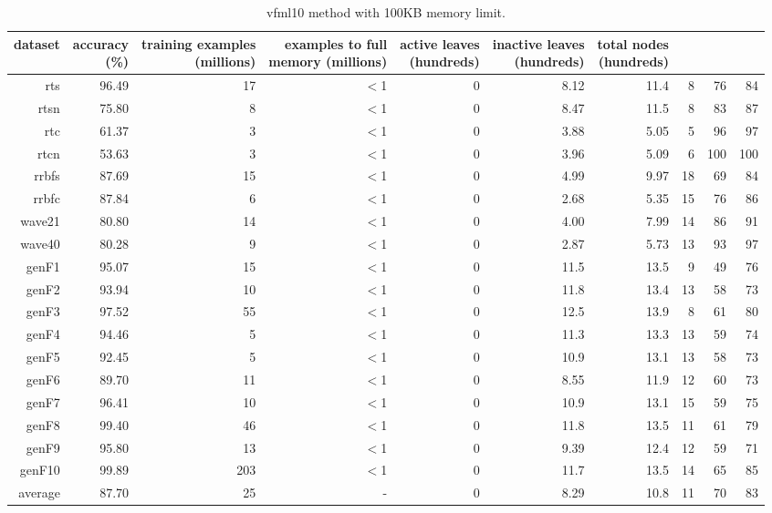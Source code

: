 \begin{table}
\caption{{\sc vfml10} method with 100KB memory limit.}
\label{tab:vfml10-100k}
\centering
\begin{tabular}{|r|r|r|r|r|r|r|r|r|r|}
\hline
dataset	&
\rotatebox{90}{\parbox{9em}{accuracy\\(\%)}} &
\rotatebox{90}{\parbox{9em}{training examples\\(millions)}} &
\rotatebox{90}{\parbox{9em}{examples to full\\memory (millions)}} &
\rotatebox{90}{\parbox{9em}{active leaves\\(hundreds)}} &
\rotatebox{90}{\parbox{9em}{inactive leaves\\(hundreds)}} &
\rotatebox{90}{\parbox{9em}{total nodes\\(hundreds)}} &
\rotatebox{90}{\parbox{9em}{tree depth}}	&
\rotatebox{90}{\parbox{9em}{training speed (\%)}} &
\rotatebox{90}{\parbox{9em}{prediction speed (\%)}} \\
\hline
{\sc rts} & 96.49 & 17 & $<$1 & 0 & 8.12 & 11.4 & 8 & 76 & 84 \\
{\sc rtsn} & 75.80 & 8 & $<$1 & 0 & 8.47 & 11.5 & 8 & 83 & 87 \\
{\sc rtc} & 61.37 & 3 & $<$1 & 0 & 3.88 & 5.05 & 5 & 96 & 97 \\
{\sc rtcn} & 53.63 & 3 & $<$1 & 0 & 3.96 & 5.09 & 6 & 100 & 100 \\
{\sc rrbfs} & 87.69 & 15 & $<$1 & 0 & 4.99 & 9.97 & 18 & 69 & 84 \\
{\sc rrbfc} & 87.84 & 6 & $<$1 & 0 & 2.68 & 5.35 & 15 & 76 & 86 \\
{\sc wave21} & 80.80 & 14 & $<$1 & 0 & 4.00 & 7.99 & 14 & 86 & 91 \\
{\sc wave40} & 80.28 & 9 & $<$1 & 0 & 2.87 & 5.73 & 13 & 93 & 97 \\
{\sc genF1} & 95.07 & 15 & $<$1 & 0 & 11.5 & 13.5 & 9 & 49 & 76 \\
{\sc genF2} & 93.94 & 10 & $<$1 & 0 & 11.8 & 13.4 & 13 & 58 & 73 \\
{\sc genF3} & 97.52 & 55 & $<$1 & 0 & 12.5 & 13.9 & 8 & 61 & 80 \\
{\sc genF4} & 94.46 & 5 & $<$1 & 0 & 11.3 & 13.3 & 13 & 59 & 74 \\
{\sc genF5} & 92.45 & 5 & $<$1 & 0 & 10.9 & 13.1 & 13 & 58 & 73 \\
{\sc genF6} & 89.70 & 11 & $<$1 & 0 & 8.55 & 11.9 & 12 & 60 & 73 \\
{\sc genF7} & 96.41 & 10 & $<$1 & 0 & 10.9 & 13.1 & 15 & 59 & 75 \\
{\sc genF8} & 99.40 & 46 & $<$1 & 0 & 11.8 & 13.5 & 11 & 61 & 79 \\
{\sc genF9} & 95.80 & 13 & $<$1 & 0 & 9.39 & 12.4 & 12 & 59 & 71 \\
{\sc genF10} & 99.89 & 203 & $<$1 & 0 & 11.7 & 13.5 & 14 & 65 & 85 \\
\hline
average & 87.70 & 25 &  -  & 0 & 8.29 & 10.8 & 11 & 70 & 83 \\
\hline
\end{tabular}
\end{table}
